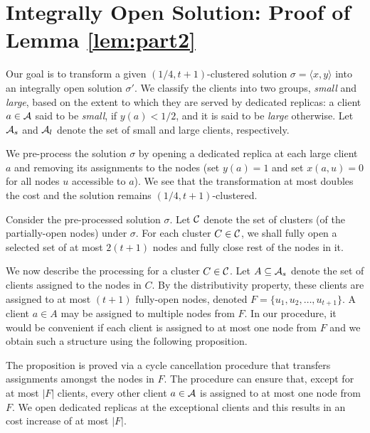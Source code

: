 \documentclass[11pt]{article}
\newcommand{\calA} {{\cal A}}
\newcommand{\calC} {{\cal C}}
\newcommand{\pair}[2] {\langle #1, #2\rangle}
\begin{document}
\section{Integrally Open Solution: Proof of Lemma \ref{lem:part2}}
\label{sec:part2}
Our goal is to transform a given $(1/4, t+1)$-clustered solution $\sigma=\pair{x}{y}$ into an integrally open solution $\sigma'$.
We classify the clients into two groups, {\em small} and {\em large},
based on the extent to which they are served by dedicated replicas:
a client $a\in \calA$ said to be {\em small}, if $y(a) < 1/2$, and it is said to be {\em large} otherwise.
Let $\calA_s$ and $\calA_l$ denote the set of small and large clients, respectively.

We pre-process the solution $\sigma$ by opening a dedicated replica at each large client $a$
and removing its assignments to the nodes
(set $y(a) = 1$ and set $x(a, u) = 0$ for all nodes $u$ accessible to $a$).
We see that the transformation at most doubles the cost
and the solution remains $(1/4, t+1)$-clustered.

Consider the pre-processed solution $\sigma$. 
Let $\calC$ denote the set of clusters (of the partially-open nodes) under $\sigma$.
For each cluster $C\in \calC$, we shall fully open a selected set of at most $2(t+1)$ nodes
and fully close  rest of the nodes in it.

We now describe the processing for a cluster $C\in \calC$.
Let $A\subseteq \calA_s$ denote the set of clients assigned to the nodes in $C$. 
By the distributivity property, these clients are assigned to
at most $(t+1)$ fully-open nodes, denoted $F=\{u_1, u_2, \ldots, u_{t+1}\}$.
A client $a\in A$ may be assigned to multiple nodes from $F$.
In our procedure, it would be convenient if each client is assigned to at most one node from $F$
and we obtain such a structure using the following proposition.

The proposition is proved via a cycle cancellation procedure
that transfers assignments amongst the nodes in $F$. 
The procedure can ensure that, except for at most $|F|$ clients,  every other client $a\in \calA$ is assigned to at most one node from $F$.
We open dedicated replicas at the exceptional clients and this results in an cost increase of at most $|F|$.
\end{document}
